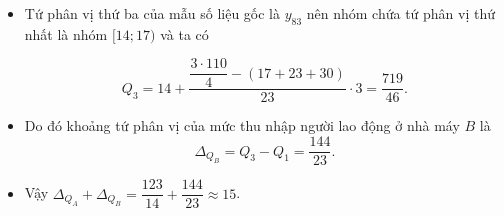 \begin{bt}
{\begin{itemize}
	$$ Q_1=8+\dfrac{\dfrac{110}{4}-17}{23}\cdot 3=\dfrac{431}{46}.$$
	
	\item	Tứ phân vị thứ ba của mẫu số liệu gốc là $y_{83}$ nên nhóm chứa tứ phân vị thứ nhất là nhóm $[14; 17)$ và ta có
	
	$$
	Q_3=14+\dfrac{\dfrac{3\cdot 110}{4}-(17+23+30)}{23} \cdot 3=\dfrac{719}{46}.
	$$
	
	\item Do đó khoảng tứ phân vị của mức thu nhập người lao động ở nhà máy $B$ là $$\Delta_{Q_B}=Q_3-Q_1=\dfrac{144}{23}.$$
	
	\item	Vậy $\Delta_{Q_A}+\Delta_{Q_B}=\dfrac{123}{14}+\dfrac{144}{23} \approx 15$.
	\end{itemize}
	}
\end{bt}

